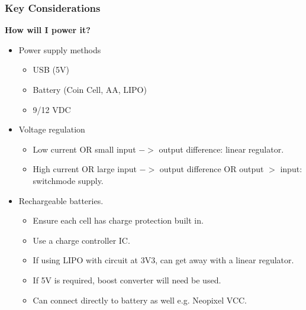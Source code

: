 \documentclass[t]{beamer}
\begin{document}
\begin{frame}
\frametitle{Key Considerations}
\large{\textbf{ How will I power it?}}
\vspace{1mm}
\begin{itemize}
	\item Power supply methods
	\begin{itemize}
		\item USB (5V)
		\item Battery (Coin Cell, AA, LIPO)
		\item 9/12 VDC
	\end{itemize}
	\item Voltage regulation
	\begin{itemize}
		\item Low current OR small input $->$ output difference: linear regulator.
		\item High current OR large input $->$ output difference OR output $>$ input: switchmode supply.
	\end{itemize}
	\item Rechargeable batteries.
	\begin{itemize}
		\item Ensure each cell has charge protection built in.
		\item Use a charge controller IC.
		\item If using LIPO with circuit at 3V3, can get away with a linear regulator.
		\item If 5V is required, boost converter will need be used.
		\item Can connect directly to battery as well e.g. Neopixel VCC. 
	\end{itemize}
\end{itemize}
\end{frame}

\end{document}
